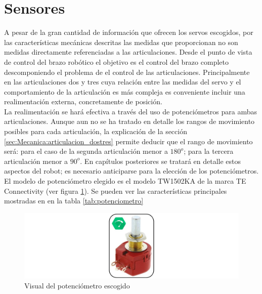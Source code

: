 \section{Sensores} \label{sec:Electronica:Sensores}
    A pesar de la gran cantidad de información que ofrecen los servos escogidos, por las características mecánicas descritas las medidas que proporcionan no son medidas directamente referenciadas a las articulaciones. Desde el punto de vista de control del brazo robótico el objetivo es el control del brazo completo descomponiendo el problema de el control de las articulaciones. Principalmente en las articulaciones dos y tres cuya relación entre las medidas del servo y el comportamiento de la articulación es más compleja es conveniente incluir una realimentación externa, concretamente de posición.
    \\

    La realimentación se hará efectiva a través del uso de potenciómetros para ambas articulaciones. Aunque aun no se ha tratado en detalle los rangos de movimiento posibles para cada articulación, la explicación de la sección \ref{sec:Mecanica:articulacion_dostres} permite deducir que el rango de movimiento será: para el caso de la segunda articulación menor a $180^o$; para la tercera articulación menor a $90^o$. En capítulos posteriores se tratará en detalle estos aspectos del robot; es necesario anticiparse para la elección de los potenciómetros.
    \\

    El modelo de potenciómetro elegido es el modelo TW1502KA de la marca TE Connectivity (ver figura \ref{fig:Electronica:potenciometro}). Se pueden ver las características principales mostradas en \cite{potenciometroSheet} en la tabla \ref{tab:potenciometro}

    \begin{figure}[H]
    	\centering
    	\includegraphics[width=\textwidth]{figuras/Imagenes_Electronica/potenciometro.jpg}
    	\caption{Visual del potenciómetro escogido}
    	\label{fig:Electronica:potenciometro}
    \end{figure}

